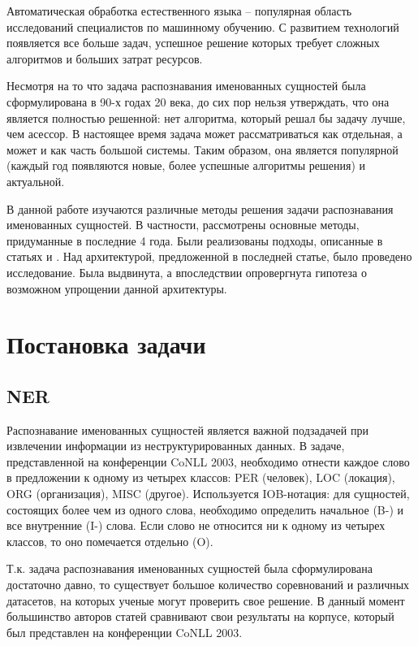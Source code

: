 \documentclass[a4paper,14pt]{extarticle}
\begin{document}
\tableofcontents 
\clearpage


Автоматическая обработка естественного языка -- популярная область исследований специалистов по машинному обучению. С развитием технологий появляется все больше задач, успешное решение которых требует сложных алгоритмов и больших затрат ресурсов.

Несмотря на то что задача распознавания именованных сущностей была сформулирована в 90-х годах 20 века, до сих пор нельзя утверждать, что она является полностью решенной: нет алгоритма, который решал бы задачу лучше, чем асессор. В настоящее время задача может рассматриваться как отдельная, а может и как часть большой системы. Таким образом, она является популярной (каждый год появляются новые, более успешные алгоритмы решения) и актуальной.

В данной работе изучаются различные методы решения задачи распознавания именованных сущностей. В частности, рассмотрены основные методы, придуманные в последние 4 года. Были реализованы подходы, описанные в статьях \cite{1603.01354} и \cite{1808.09075}. Над архитектурой, предложенной в последней статье, было проведено исследование. Была выдвинута, а впоследствии опровергнута гипотеза о возможном упрощении данной архитектуры.

\clearpage

\section{Постановка задачи}

\subsection{NER}

Распознавание именованных сущностей является важной подзадачей при извлечении информации из неструктурированных данных. В задаче, представленной на конференции CoNLL 2003, необходимо отнести каждое слово в предложении к одному из четырех классов: PER (человек), LOC (локация), ORG (организация), MISC (другое). Используется IOB-нотация: для сущностей, состоящих более чем из одного слова, необходимо определить начальное (B-) и все внутренние (I-) слова. Если слово не относится ни к одному из четырех классов, то оно помечается отдельно (O).

Т.к. задача распознавания именованных сущностей была сформулирована достаточно давно, то существует большое количество соревнований и различных датасетов, на которых ученые могут проверить свое решение. В данный момент большинство авторов статей сравнивают свои результаты на корпусе, который был представлен на конференции CoNLL 2003.
\end{document}
